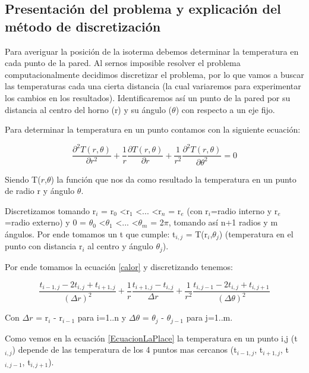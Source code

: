 \subsection{Presentaci\'on del problema y explicaci\'on del m\'etodo de discretizaci\'on}
Para averiguar la posici\'on de la isoterma debemos determinar la temperatura en cada punto de la pared. Al sernos imposible resolver el problema computacionalmente decidimos discretizar el problema, por lo que vamos a buscar las temperaturas cada una cierta distancia (la cual variaremos para experimentar los cambios en los resultados). Identificaremos as\'i un punto de la pared por su distancia al centro del horno (r) y su \'angulo ($\theta$) con respecto a un eje fijo.

Para determinar la temperatura en un punto contamos con la siguiente ecuaci\'on:

\begin{equation}\label{calor}
\frac{\partial^2T(r,\theta)}{\partial r^2}+\frac{1}{r}\frac{\partial T(r,\theta)}{\partial r}+\frac{1}{r^2}\frac{\partial^2T(r,\theta)}{\partial \theta^2} = 0 
\end{equation}

Siendo T($r$,$\theta$) la funci\'on que nos da como resultado la temperatura en un punto de radio r y \'angulo $\theta$.

Discretizamos tomando r$_i$ = r$_0$ \textless r$_1$ \textless ... \textless r$_n$ = r$_e$ (con r$_i$=radio interno y r$_e$=radio externo) y 0 = $\theta _0$ \textless $\theta _1$ \textless ... \textless $\theta _m$ = 2$\pi$, tomando así n+1 radios y m \'angulos. Por ende tomamos un t que cumple: t$_{i,j}$ = T(r$_i$,$\theta _j$) (temperatura en el punto con distancia r$_i$ al centro y \'angulo $\theta _j$).

Por ende tomamos la ecuaci\'on \ref{calor} y discretizando tenemos:

\begin{equation}
\label{EcuacionLaPlace}
\frac{t_{i-1,j}-2t_{i,j}+t_{i+1,j}}{(\Delta r)^2}+\frac{1}{r}\frac{t_{i+1,j}-t_{i,j}}{\Delta r}+\frac{1}{r^2}\frac{t_{i,j-1}-2t_{i,j}+t_{i,j+1}}{(\Delta \theta)^2}
\end{equation}

Con $\Delta r$ = r$_i$ - r$_{i-1}$ para i=1..n y $\Delta \theta$ = $\theta _j$ - $\theta _{j-1}$ para j=1..m.

Como vemos en la ecuaci\'on \ref{EcuacionLaPlace} la temperatura en un punto i,j (t$_{i,j}$) depende de las temperatura de los 4 puntos mas cercanos (t$_{i-1,j}$, t$_{i+1,j}$, t$_{i,j-1}$, t$_{i,j+1}$).

